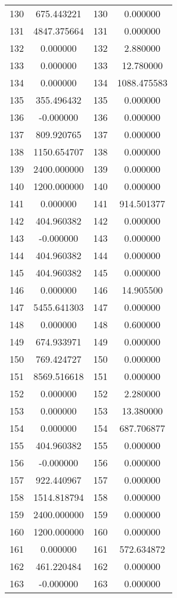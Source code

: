 \documentclass[12pt]{article}
\begin{document}
\begin{longtable}{@{}cccc@{}}
130 & 675.443221 & 130 & 0.000000 \\
131 & 4847.375664 & 131 & 0.000000 \\
132 & 0.000000 & 132 & 2.880000 \\
133 & 0.000000 & 133 & 12.780000 \\
134 & 0.000000 & 134 & 1088.475583 \\
135 & 355.496432 & 135 & 0.000000 \\
136 & -0.000000 & 136 & 0.000000 \\
137 & 809.920765 & 137 & 0.000000 \\
138 & 1150.654707 & 138 & 0.000000 \\
139 & 2400.000000 & 139 & 0.000000 \\
140 & 1200.000000 & 140 & 0.000000 \\
141 & 0.000000 & 141 & 914.501377 \\
142 & 404.960382 & 142 & 0.000000 \\
143 & -0.000000 & 143 & 0.000000 \\
144 & 404.960382 & 144 & 0.000000 \\
145 & 404.960382 & 145 & 0.000000 \\
146 & 0.000000 & 146 & 14.905500 \\
147 & 5455.641303 & 147 & 0.000000 \\
148 & 0.000000 & 148 & 0.600000 \\
149 & 674.933971 & 149 & 0.000000 \\
150 & 769.424727 & 150 & 0.000000 \\
151 & 8569.516618 & 151 & 0.000000 \\
152 & 0.000000 & 152 & 2.280000 \\
153 & 0.000000 & 153 & 13.380000 \\
154 & 0.000000 & 154 & 687.706877 \\
155 & 404.960382 & 155 & 0.000000 \\
156 & -0.000000 & 156 & 0.000000 \\
157 & 922.440967 & 157 & 0.000000 \\
158 & 1514.818794 & 158 & 0.000000 \\
159 & 2400.000000 & 159 & 0.000000 \\
160 & 1200.000000 & 160 & 0.000000 \\
161 & 0.000000 & 161 & 572.634872 \\
162 & 461.220484 & 162 & 0.000000 \\
163 & -0.000000 & 163 & 0.000000 \\

\end{longtable}
\end{document}
